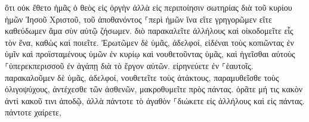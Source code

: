 \documentclass{openreader}
\begin{document}
ὅτι οὐκ ἔθετο ἡμᾶς ὁ θεὸς εἰς ὀργὴν ἀλλὰ εἰς περιποίησιν σωτηρίας διὰ τοῦ κυρίου ἡμῶν Ἰησοῦ Χριστοῦ, 
τοῦ ἀποθανόντος ⸀περὶ ἡμῶν ἵνα εἴτε γρηγορῶμεν εἴτε καθεύδωμεν ἅμα σὺν αὐτῷ ζήσωμεν. 
διὸ παρακαλεῖτε ἀλλήλους καὶ οἰκοδομεῖτε εἷς τὸν ἕνα, καθὼς καὶ ποιεῖτε. 
Ἐρωτῶμεν δὲ ὑμᾶς, ἀδελφοί, εἰδέναι τοὺς κοπιῶντας ἐν ὑμῖν καὶ προϊσταμένους ὑμῶν ἐν κυρίῳ καὶ νουθετοῦντας ὑμᾶς, 
καὶ ἡγεῖσθαι αὐτοὺς ⸀ὑπερεκπερισσοῦ ἐν ἀγάπῃ διὰ τὸ ἔργον αὐτῶν. εἰρηνεύετε ἐν ⸀ἑαυτοῖς. 
παρακαλοῦμεν δὲ ὑμᾶς, ἀδελφοί, νουθετεῖτε τοὺς ἀτάκτους, παραμυθεῖσθε τοὺς ὀλιγοψύχους, ἀντέχεσθε τῶν ἀσθενῶν, μακροθυμεῖτε πρὸς πάντας. 
ὁρᾶτε μή τις κακὸν ἀντὶ κακοῦ τινι ἀποδῷ, ἀλλὰ πάντοτε τὸ ἀγαθὸν ⸀διώκετε εἰς ἀλλήλους καὶ εἰς πάντας. 
πάντοτε χαίρετε, 
\end{document}
